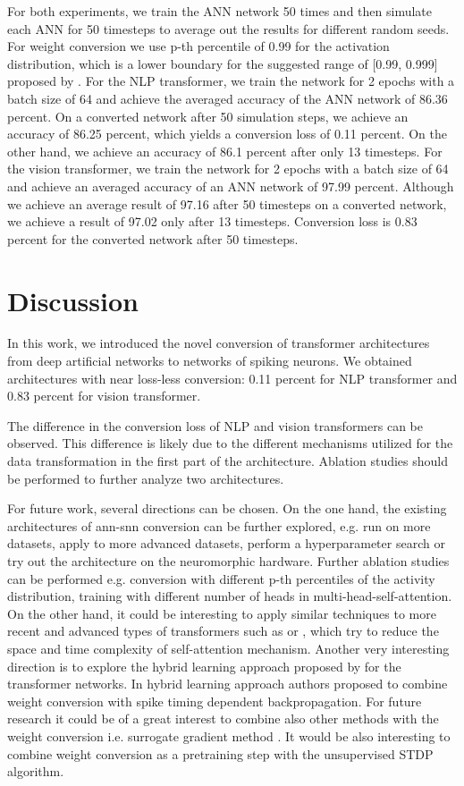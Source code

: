 \documentclass{article}
\begin{document}
For both experiments, we train the ANN network 50 times and then simulate each ANN for 50 timesteps to average out the results for different random seeds. For weight conversion we use p-th percentile of 0.99 for the activation distribution, which is a lower boundary for the suggested range of [0.99, 0.999] proposed by \cite{rueckauer2016theory}.
For the NLP transformer, we train the network for 2 epochs with a batch size of 64 and achieve the averaged accuracy of the ANN network of 86.36 percent. On a converted network after 50 simulation steps, we achieve an accuracy of 86.25 percent, which yields a conversion loss of 0.11 percent. On the other hand, we achieve an accuracy of 86.1 percent after only 13 timesteps.
For the vision transformer, we train the network for 2 epochs with a batch size of 64 and achieve an averaged accuracy of an ANN network of 97.99 percent. Although we achieve an average result of 97.16 after 50 timesteps on a converted network, we achieve a result of 97.02 only after 13 timesteps. Conversion loss is 0.83 percent for the converted network after 50 timesteps.


\section{Discussion}
In this work, we introduced the novel conversion of transformer architectures from deep artificial networks to networks of spiking neurons. We obtained architectures with near loss-less conversion: 0.11 percent for NLP transformer and 0.83 percent for vision transformer.

The difference in the conversion loss of NLP and vision transformers can be observed. This difference is likely due to the different mechanisms utilized for the data transformation in the first part of the architecture. Ablation studies should be performed to further analyze two architectures.

For future work, several directions can be chosen. On the one hand, the existing architectures of ann-snn conversion can be further explored, e.g. run on more datasets, apply to more advanced datasets, perform a hyperparameter search or try out the architecture on the neuromorphic hardware. Further ablation studies can be performed e.g. conversion with different p-th percentiles of the activity distribution, training with different number of heads in multi-head-self-attention. On the other hand, it could be interesting to apply similar techniques to more recent and advanced types of transformers such as \cite{performer} or \cite{linformer}, which try to reduce the space and time complexity of self-attention mechanism. Another very interesting direction is to explore the hybrid learning approach proposed by \cite{hybrid_conversion} for the transformer networks. In hybrid learning approach authors proposed to combine weight conversion with spike timing dependent backpropagation. For future research it could be of a great interest to combine also other methods with the weight conversion i.e. surrogate gradient method \cite{surrogate}. It would be also interesting to combine weight conversion as a pretraining step with the unsupervised STDP algorithm.



\end{document}
